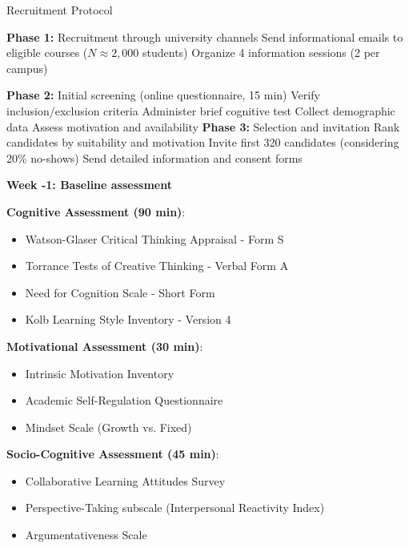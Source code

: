 \begin{algorithm}[H]
\caption{Recruitment Protocol}
\label{alg:recruitment}
\begin{algorithmic}[1]
\State \textbf{Phase 1:} Recruitment through university channels
\State Send informational emails to eligible courses ($N \approx 2,000$ students)
\State Organize 4 information sessions (2 per campus)

\State \textbf{Phase 2:} Initial screening (online questionnaire, 15 min)
    \State Verify inclusion/exclusion criteria
    \State Administer brief cognitive test
    \State Collect demographic data
    \State Assess motivation and availability
\EndFor
\State \textbf{Phase 3:} Selection and invitation
\State Rank candidates by suitability and motivation
\State Invite first 320 candidates (considering 20\% no-shows)
\State Send detailed information and consent forms
\end{algorithmic}
\end{algorithm}

\textbf{Week -1: Baseline assessment}

\textbf{Cognitive Assessment (90 min)}:
\begin{itemize}
    \item Watson-Glaser Critical Thinking Appraisal - Form S \cite{Watson2012}
    \item Torrance Tests of Creative Thinking - Verbal Form A \cite{Torrance1966}
    \item Need for Cognition Scale - Short Form \cite{Cacioppo1984}
    \item Kolb Learning Style Inventory - Version 4 \cite{Kolb2013}
\end{itemize}

\textbf{Motivational Assessment (30 min)}:
\begin{itemize}
    \item Intrinsic Motivation Inventory \cite{Ryan1982}
    \item Academic Self-Regulation Questionnaire \cite{Ryan1998}
    \item Mindset Scale (Growth vs. Fixed) \cite{Dweck2006}
\end{itemize}

\textbf{Socio-Cognitive Assessment (45 min)}:
\begin{itemize}
    \item Collaborative Learning Attitudes Survey \cite{Johnson1991}
    \item Perspective-Taking subscale (Interpersonal Reactivity Index) \cite{Davis1980}
    \item Argumentativeness Scale \cite{Infante1982}
\end{itemize}

